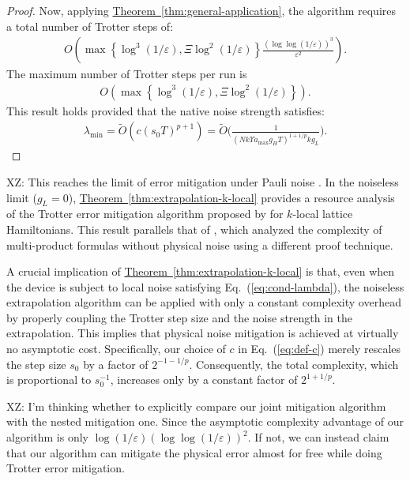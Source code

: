 \documentclass[11pt]{article}
\newcommand{\eq}[1]{(\ref{eq:#1})}
\newcommand{\thm}[1]{\hyperref[thm:#1]{Theorem~\ref*{thm:#1}}}
\newcommand{\eps}{\varepsilon}
\newcommand{\xz}[1]{{\color{cyan} XZ: #1}}
\begin{document}
\begin{proof}
    Now, applying \thm{general-application}, the algorithm requires a total number of Trotter steps of:
    \begin{align*}
         O\left( \max\left\{\log^3(1/\eps), \Xi \log^2(1/\eps)\right\} \frac{(\log\log (1/\eps))^3}{\eps^2} \right).
    \end{align*}
    The maximum number of Trotter steps per run is
    \begin{align*}
  O\left( \max\left\{\log^3(1/\eps), \Xi \log^2(1/\eps)\right\} \right).
    \end{align*}
    This result holds provided that the native noise strength satisfies:
    \begin{align*}
        \lambda_{\min} = \widetilde{O}(c(s_0T)^{p+1}) = \widetilde{O}\Big(\frac{1}{ (Nk\Upsilon a_{\max}g_HT)^{1+1/p} kg_L }\Big).
    \end{align*}
\end{proof}
\xz{This reaches the limit of error mitigation under Pauli noise \cite{wang2021noise, cai2021multi}.}
In the noiseless limit ($g_L = 0$), \thm{extrapolation-k-local} provides a resource analysis of the Trotter error mitigation algorithm proposed by \citet{watson2025exponentially} for $k$-local lattice Hamiltonians. This result parallels that of \citet{mizuta2025commutator}, which analyzed the complexity of multi-product formulas without physical noise using a different proof technique.

A crucial implication of \thm{extrapolation-k-local} is that, even when the device is subject to local noise satisfying Eq.~\eq{cond-lambda}, the noiseless extrapolation algorithm can be applied with only a constant complexity overhead by properly coupling the Trotter step size and the noise strength in the extrapolation. This implies that physical noise mitigation is achieved at virtually no asymptotic cost. Specifically, our choice of $c$ in Eq.~\eq{def-c} merely rescales the step size $s_0$ by a factor of $2^{-1-1/p}$. Consequently, the total complexity, which is proportional to $s_0^{-1}$, increases only by a constant factor of $2^{1+1/p}$.

\xz{I'm thinking whether to explicitly compare our joint mitigation algorithm with the nested mitigation one. Since the asymptotic complexity advantage of our algorithm is only $\log(1/\eps)(\log\log(1/\eps))^2$. If not, we can instead claim that our algorithm can mitigate the physical error almost for free while doing Trotter error mitigation. }
\end{document}
